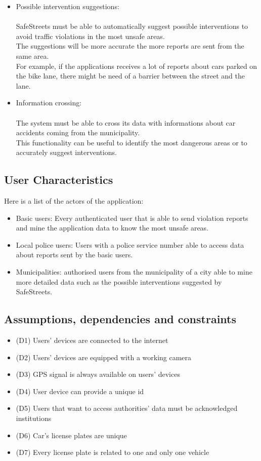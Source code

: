 \begin{itemize}
	\item Possible intervention suggestions: \\ \\
	SafeStreets must be able to automatically suggest possible interventions to avoid traffic violations in the most unsafe areas. \\
	The suggestions will be more accurate the more reports are sent from the same area. \\
	For example, if the applications receives a lot of reports about cars parked on the bike lane, there might be need of a barrier between the street and the lane.
	
	\item Information crossing: \\ \\
	The system must be able to cross its data with informations about car accidents coming from the municipality. \\
	This functionality can be useful to identify the most dangerous areas or to accurately suggest interventions.  
\end{itemize}

\subsection{User Characteristics}
Here is a list of the actors of the application: 
\begin{itemize}
	\item Basic users: Every authenticated user that is able to send violation reports and mine the application data to know the most unsafe areas. 
	\item Local police users: Users with a police service number able to access data about reports sent by the basic users. 
	\item Municipalities: authorised users from the municipality of a city able to mine more detailed data such as the possible interventions suggested by SafeStreets. 
\end{itemize}

\subsection{Assumptions, dependencies and constraints }
\begin{itemize}
	\item (D1) Users’ devices are connected to the internet 
	\item (D2) Users’ devices are equipped with a working camera 
	\item (D3) GPS signal is always available on users’ devices 
	\item (D4) User device can provide a unique id
	\item (D5) Users that want to access authorities’ data must be acknowledged institutions 
	\item (D6) Car’s license plates are unique 
	\item (D7) Every license plate is related to one and only one vehicle
\end{itemize}
 
